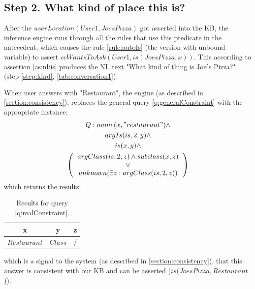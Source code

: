 \subsection{Step 2. What kind of place this is?}
\label{section:step2}
After the $userLocation(User1,JoesPizza)$ got asserted into the KB, the 
inference engine runs through all the rules that use this predicate in the
antecedent, which causes the rule \ref{rule:autoIs} (the version with unbound
variable) to assert $ccWantsToAsk(User1, is(JoesPizza,x))$. This according to
assertion \ref{as:nl:is} produces the NL text 
"What kind of thing is Joe's Pizza?" (step \autoref{step:kind}, 
\autoref{tab:conversation1}).

When user answers with "Restaurant", the engine (as described in 
\autoref{section:consistency}), replaces the general query 
\ref{q:generalConstraint} with the appropriate instance:
\begin{equation}\label{q:realConstraint}
\begin{gathered}
    Q:name(x,"restaurant")\land \\ %
    argIs(is,2,y)\land \\ %
    is(x,y)\land \\
    \left(
    \begin{tabular}{c}
        $argClass(is,2,z) \land subclass(x,z)$\\
        $\lor$\\
        $unknown(\exists z:argClass(is,2,z))$ \\
    \end{tabular}
    \right)
\end{gathered}
\end{equation}
which returns the results:
\begin{table}[H]
\centering
\caption{Results for query \ref{q:realConstraint}.}
\label{tab:realConstraintResults}
\begin{tabular}{|c|c|c|}
	\hline
	\textbf{x} & \textbf{y} & \textbf{z} \\
    \hline
    $Restaurant$ & $Class$ & / \\
    \hline
\end{tabular}
\end{table}
which is a signal to the system (as described in \autoref{section:consistency}),
that this answer is consistent with our KB and can be asserted 
($is(JoesPizza,Restaurant$)).

